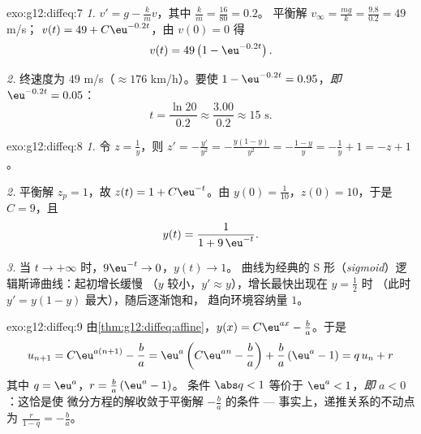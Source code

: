 \begin{solution}{exo:g12:diffeq:7}
\emph{1.} $v' = g - \frac{k}{m} v$，其中 $\frac km = \frac{16}{80} = 0.2$。
平衡解 $v_\infty = \frac{mg}{k} = \frac{9.8}{0.2} = 49$ m/s；
$v(t) = 49 + C\eu^{-0.2t}$，由 $v(0) = 0$ 得
\[
v(t) = 49\left(1 - \eu^{-0.2 t}\right).
\]

\emph{2.} 终速度为 $49$ m/s（$\approx 176$ km/h）。要使
$1 - \eu^{-0.2t} = 0.95$，\emph{即} $\eu^{-0.2t} = 0.05$：
\[
t = \frac{\ln 20}{0.2} \approx \frac{3.00}{0.2} \approx 15 \text{ s}.
\]
\end{solution}

\begin{solution}{exo:g12:diffeq:8}
\emph{1.} 令 $z = \frac1y$，则 $z' = -\frac{y'}{y^2}
= -\frac{y(1-y)}{y^2} = -\frac{1-y}{y} = -\frac1y + 1 = -z + 1$。

\emph{2.} 平衡解 $z_p = 1$，故 $z(t) = 1 + C\eu^{-t}$。由
$y(0) = \frac{1}{10}$，$z(0) = 10$，于是 $C = 9$，且
\[
y(t) = \frac{1}{1 + 9\,\eu^{-t}} .
\]

\emph{3.} 当 $t \to +\infty$ 时，$9\eu^{-t} \to 0$，$y(t) \to 1$。
曲线为经典的 S 形（\emph{sigmoid}）逻辑斯谛曲线：起初增长缓慢
（$y$ 较小，$y' \approx y$），增长最快出现在 $y = \frac12$ 时
（此时 $y' = y(1-y)$ 最大），随后逐渐饱和，
趋向环境容纳量 $1$。
\end{solution}

\begin{solution}{exo:g12:diffeq:9}
由\cref{thm:g12:diffeq:affine}，$y(x) = C\eu^{ax} - \frac ba$。于是
\[
u_{n+1} = C\eu^{a(n+1)} - \frac ba
= \eu^{a}\left(C\eu^{an} - \frac ba\right) + \frac ba\left(\eu^a - 1\right)
= q\,u_n + r
\]
其中 $q = \eu^{a}$，$r = \frac{b}{a}\left(\eu^{a} - 1\right)$。
条件 $\abs q < 1$ 等价于 $\eu^a < 1$，\emph{即} $a < 0$：这恰是使
微分方程的解收敛于平衡解
$-\frac ba$ 的条件 --- 事实上，递推关系的不动点
为 $\frac{r}{1 - q} = -\frac{b}{a}$。
\end{solution}

